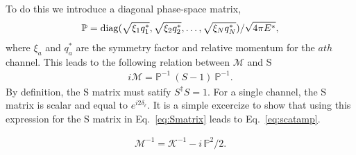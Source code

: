 \documentclass{iopart}
\theoremstyle{definition}
\begin{document}
{To do this we introduce a diagonal phase-space matrix,
\begin{eqnarray}
\mathbb{P}={\rm{diag}}(\sqrt{\xi_1q^{*}_1},\sqrt{\xi_2q^{*}_2},\ldots,\sqrt{\xi_Nq^{*}_N})/\sqrt{4\pi E^*},
\end{eqnarray}
where $\xi_a$ and $q^{*}_a$ are the symmetry factor and relative momentum for the $ath$ channel. This leads to the following relation between $\mathcal M$ and S~\cite{Hansen:2012tf}
%
\begin{eqnarray}
i\mathcal{M}=\mathbb{P}^{-1}~{(S-1)}~\mathbb{P}^{-1}.\label{eq:Smatrix}
\end{eqnarray}
By definition, the S matrix must satify $S^\dag S=1$. For a single channel, the S matrix is scalar and equal to $e^{i2\delta_\ell}$. It is a simple excercize to show that using this expression for the S matrix in Eq.~\ref{eq:Smatrix} leads to Eq.~\ref{eq:scatamp}. 


\begin{eqnarray}
\mathcal{M}^{-1}=\mathcal{K}^{-1}-i\,\mathbb{P}^{2}/2.\label{eq:Kmatrix}
\end{eqnarray}


}
\end{document}
